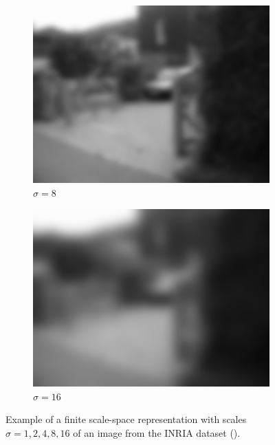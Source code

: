 \documentclass[thesis.tex]{subfiles}
\begin{document}
\begin{figure}[p]
\begin{subfigure}[t]{0.3\textwidth}
		\includegraphics[width=\textwidth]{img/scaleSpaceTheory_8.png}
		\caption{$\sigma = 8$}
		\label{fig:scaleSpaceExample8}
	\end{subfigure}
	\begin{subfigure}[t]{0.3\textwidth}
		\includegraphics[width=\textwidth]{img/scaleSpaceTheory_16.png}
		\caption{$\sigma = 16$}
		\label{fig:scaleSpaceExample16}
	\end{subfigure}
	\caption{Example of a finite scale-space representation with scales $\sigma = 1,2,4,8,16$ of an image from the INRIA dataset ().}
	\label{fig:scaleSpaceExample}
	\vspace{0.5cm}
	

\end{figure}
\end{document}
